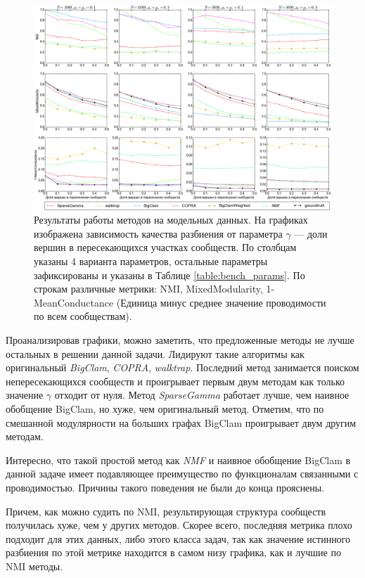 \documentclass{ITaSconf}
\begin{document}
	\begin{figure}[!t]
		\centering
		\includegraphics[width=\textwidth]{imgs/experiments_all.png}
		\caption{Результаты работы методов на модельных данных.
	На графиках изображена зависимость качества разбиения от параметра $\gamma$ --- доли вершин в пересекающихся участках сообществ.
	По столбцам указаны 4 варианта параметров, остальные параметры зафиксированы и указаны в Таблице \ref{table:bench_params}.
	По строкам различные метрики: NMI, MixedModularity, 1-MeanConductance (Единица минус среднее значение проводимости по всем сообществам).}
		\label{fig:experiments}
	\end{figure}
	
	Проанализировав графики, можно заметить, что предложенные методы не лучше остальных в решении данной задачи.
	Лидируют такие алгоритмы как оригинальный \textit{BigClam}, \textit{COPRA}, \textit{walktrap}.
	Последний метод занимается поиском непересекающихся сообществ и проигрывает первым двум методам как только значение $\gamma$ отходит от нуля.
	Метод \textit{SparseGamma} работает лучше, чем наивное обобщение BigClam, но хуже, чем оригинальный метод.
	Отметим, что по смешанной модулярности на больших графах BigClam проигрывает двум другим методам.
	
	Интересно, что такой простой метод как \textit{NMF} и наивное обобщение BigClam в данной задаче имеет подавляющее преимущество по функционалам связанными с проводимостью.
	Причины такого поведения не были до конца прояснены.
	
	Причем, как можно судить по NMI, результирующая структура сообществ получилась хуже, чем у других методов.
	Скорее всего, последняя метрика плохо подходит для этих данных, либо этого класса задач, так как значение истинного разбиения по этой метрике находится в самом низу графика, как и лучшие по NMI методы.
	
\end{document}
